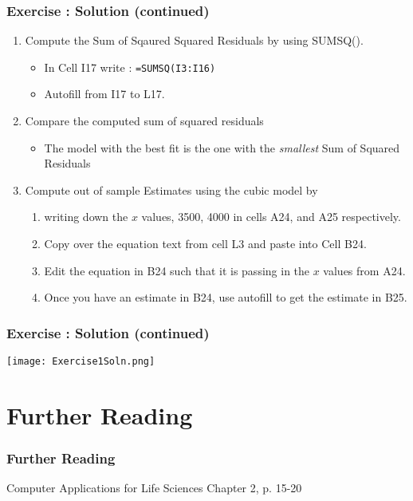\documentclass[12pt]{beamer}
\begin{document}
\begin{frame}
	\frametitle{Exercise : Solution (continued)}
	\begin{enumerate}
			\item Compute the Sum of Sqaured Squared Residuals by using SUMSQ(). 
		\begin{itemize}
			\item In Cell I17 write : \texttt{=SUMSQ(I3:I16)}
			\item Autofill from I17 to L17.
		\end{itemize} 
		\item Compare the computed sum of squared residuals
		\begin{itemize}
			\item The model with the best fit is the one with the \textit{smallest} Sum of Squared Residuals  
		\end{itemize}
		\item Compute out of sample Estimates using the cubic model by 
		\begin{enumerate}
			\item writing down the $x$ values, 3500, 4000 in cells A24, and A25 respectively.
			\item Copy over the equation text from cell L3 and paste into Cell B24. 
			\item Edit the equation in B24 such that it is passing in the $x$ values from A24.
			\item Once you have an estimate in B24, use autofill to get the estimate in B25. 
		\end{enumerate}
	\end{enumerate}	
\end{frame}
\begin{frame}
	\frametitle{Exercise : Solution (continued)}
	\texttt{[image: Exercise1Soln.png]}
\end{frame}
\section{Further Reading}
	\begin{frame}
		\frametitle{Further Reading}
		Computer Applications for Life Sciences Chapter 2, p. 15-20
	\end{frame}
\end{document}

